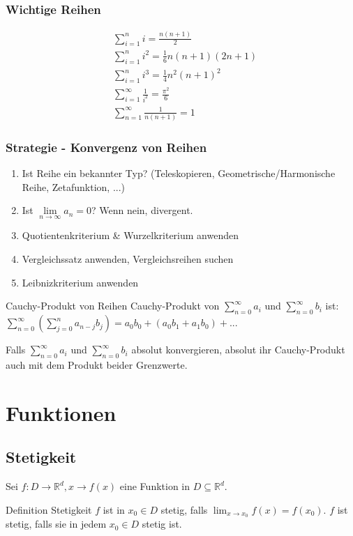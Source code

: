 \documentclass[a4paper,10pt]{article}
\def\limn{\lim\limits_{n\to \infty}}
\def\sumn{\sum\limits_{n=0}^{\infty}}
\def\R{\mathbb{R}}
\begin{document}
\subsubsection{Wichtige Reihen}
\begin{align*}
 &\sum_{i=1}^n i = \frac{n(n+1)}{2} \\
 &\sum_{i=1}^n i^2 = \frac{1}{6}n(n+1)(2n+1) \\
 &\sum_{i=1}^n i^3 = \frac{1}{4}n^2(n+1)^2 \\
 &\sum_{i=1}^\infty \frac{1}{i^2} = \frac{\pi^2}{6} \\
 &\sum_{n=1}^\infty \frac{1}{n(n+1)} =1
\end{align*}

\subsubsection{Strategie - Konvergenz von Reihen}
\begin{enumerate}
 \item Ist Reihe ein bekannter Typ? (Teleskopieren, Geometrische/Harmonische Reihe, Zetafunktion, ...)
 \item Ist $\limn a_n = 0$? Wenn nein, divergent.
 \item Quotientenkriterium \& Wurzelkriterium anwenden
 \item Vergleichssatz anwenden, Vergleichsreihen suchen
 \item Leibnizkriterium anwenden
\end{enumerate}

\begin{mainbox}{Cauchy-Produkt von Reihen}
  Cauchy-Produkt von $\sumn a_i$ und $\sumn b_i$ ist:
  $\sumn(\sum\limits_{j=0}^{n}a_{n-j}b_j) = a_0b_0 + (a_0b_1 + a_1b_0) + ...$
\end{mainbox}
Falls $\sumn a_i$ und $\sumn b_i$ absolut konvergieren, absolut ihr Cauchy-Produkt auch mit dem Produkt beider Grenzwerte.

\section{Funktionen}
\subsection{Stetigkeit}
Sei $f : D \to \R^d, x \to f(x)$ eine Funktion in $D \subseteq \R^d$.
\begin{mainbox}{Definition Stetigkeit}
 $f$ ist in $x_0 \in D$ stetig, falls $\lim_{x\to x_0} f(x) = f(x_0)$.
 $f$ ist stetig, falls sie in jedem $x_0 \in D$ stetig ist.
\end{mainbox}
\end{document}
